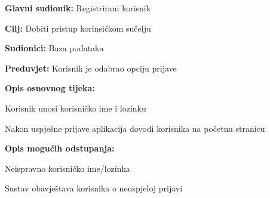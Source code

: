 				\noindent {}
					\begin{packed_item}
	
						\item \textbf{Glavni sudionik: }Registrirani korisnik
						\item  \textbf{Cilj:} Dobiti pristup korinsičkom sučelju
						\item  \textbf{Sudionici:} Baza podataka
						\item  \textbf{Preduvjet:} Korisnik je odabrao opciju prijave
						\item  \textbf{Opis osnovnog tijeka:}
						
						\item[] \begin{packed_enum}
	
							\item Korisnik unosi korisničko ime i lozinku
							\item Nakon uspješne prijave aplikacija dovodi korisnika na početnu stranicu
							
						\end{packed_enum}
						
						\item  \textbf{Opis mogućih odstupanja:}
						
						\item[] \begin{packed_item}
	
							\item[1.a] Neispravno korisničko ime/lozinka
							
								\begin{packed_item}
								
									\item Sustav obavještava korisnika o neuspjeloj prijavi
									
								\end{packed_item}
							
						\end{packed_item}				
					\end{packed_item}
					
